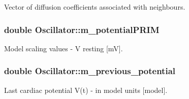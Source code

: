 Vector of diffusion coefficients associated with neighbours. 

\hypertarget{class_oscillator_aedf0974c19ea8428e3702f267cf45465}{
\subsubsection[{m\+\_\+potential\+P\+R\+I\+M}]{\setlength{\rightskip}{0pt plus 5cm}double Oscillator\+::m\+\_\+potential\+P\+R\+I\+M}}\label{class_oscillator_aedf0974c19ea8428e3702f267cf45465}


Model scaling values -\/ V resting \mbox{[}m\+V\mbox{]}. 

\hypertarget{class_oscillator_a2a1649ababe43b1de3dbd6d5f24db703}{
\subsubsection[{m\+\_\+previous\+\_\+potential}]{\setlength{\rightskip}{0pt plus 5cm}double Oscillator\+::m\+\_\+previous\+\_\+potential}}\label{class_oscillator_a2a1649ababe43b1de3dbd6d5f24db703}


Last cardiac potential V(t) -\/ in model units \mbox{[}model\mbox{]}. 

